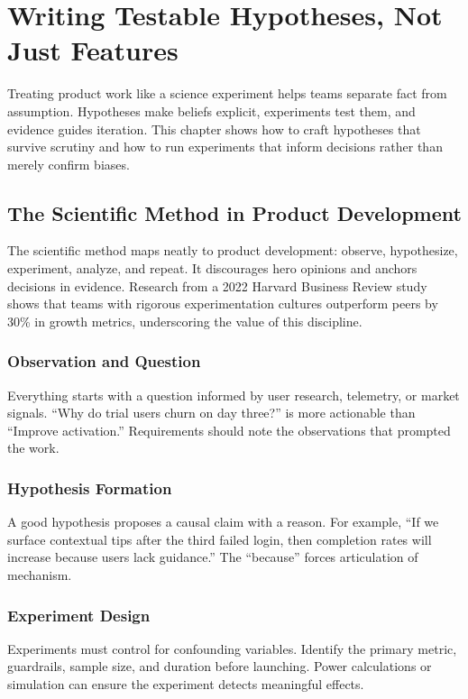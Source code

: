 \chapter{Writing Testable Hypotheses, Not Just Features}
\label{ch:testable-hypotheses}

Treating product work like a science experiment helps teams separate fact from assumption. Hypotheses make beliefs explicit, experiments test them, and evidence guides iteration. This chapter shows how to craft hypotheses that survive scrutiny and how to run experiments that inform decisions rather than merely confirm biases.

\section{The Scientific Method in Product Development}
\label{sec:scientific-method}

The scientific method maps neatly to product development: observe, hypothesize, experiment, analyze, and repeat. It discourages hero opinions and anchors decisions in evidence. Research from a 2022 Harvard Business Review study shows that teams with rigorous experimentation cultures outperform peers by 30\% in growth metrics, underscoring the value of this discipline.

\subsection{Observation and Question}
Everything starts with a question informed by user research, telemetry, or market signals. ``Why do trial users churn on day three?'' is more actionable than ``Improve activation.'' Requirements should note the observations that prompted the work.

\subsection{Hypothesis Formation}
A good hypothesis proposes a causal claim with a reason. For example, ``If we surface contextual tips after the third failed login, then completion rates will increase because users lack guidance.'' The ``because'' forces articulation of mechanism.

\subsection{Experiment Design}
Experiments must control for confounding variables. Identify the primary metric, guardrails, sample size, and duration before launching. Power calculations or simulation can ensure the experiment detects meaningful effects.

